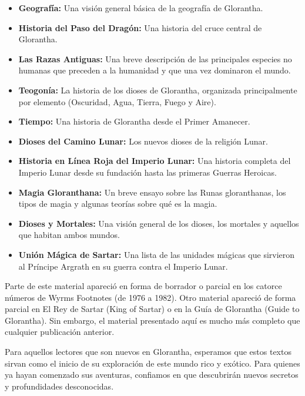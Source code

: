 \begin{itemize}
    \item \textbf{Geografía:} Una visión general básica de la geografía de Glorantha.
    \item \textbf{Historia del Paso del Dragón:} Una historia del cruce central de Glorantha.
    \item \textbf{Las Razas Antiguas:} Una breve descripción de las principales especies no humanas que preceden a la humanidad y que una vez dominaron el mundo.
    \item \textbf{Teogonía:} La historia de los dioses de Glorantha, organizada principalmente por elemento (Oscuridad, Agua, Tierra, Fuego y Aire).
    \item \textbf{Tiempo:} Una historia de Glorantha desde el Primer Amanecer.
    \item \textbf{Dioses del Camino Lunar:} Los nuevos dioses de la religión Lunar.
    \item \textbf{Historia en Línea Roja del Imperio Lunar:} Una historia completa del Imperio Lunar desde su fundación hasta las primeras Guerras Heroicas.
    \item \textbf{Magia Gloranthana:} Un breve ensayo sobre las Runas gloranthanas, los tipos de magia y algunas teorías sobre qué es la magia.
    \item \textbf{Dioses y Mortales:} Una visión general de los dioses, los mortales y aquellos que habitan ambos mundos.
    \item \textbf{Unión Mágica de Sartar:} Una lista de las unidades mágicas que sirvieron al Príncipe Argrath en su guerra contra el Imperio Lunar.
\end{itemize}

Parte de este material apareció en forma de borrador o parcial en los catorce números de Wyrms Footnotes (de 1976 a 1982). Otro material apareció de forma parcial en El Rey de Sartar (King of Sartar) o en la Guía de Glorantha (Guide to Glorantha). Sin embargo, el material presentado aquí es mucho más completo que cualquier publicación anterior.

Para aquellos lectores que son nuevos en Glorantha, esperamos que estos textos sirvan como el inicio de su exploración de este mundo rico y exótico. Para quienes ya hayan comenzado sus aventuras, confiamos en que descubrirán nuevos secretos y profundidades desconocidas.


